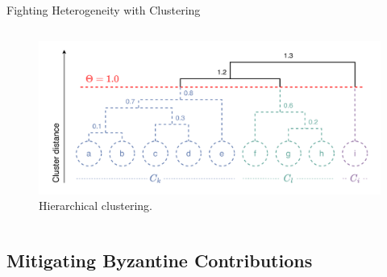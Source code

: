 \begin{frame}{Fighting Heterogeneity with Clustering}
\begin{columns}
{\begin{column}{.5\textwidth}
            \begin{figure}
                \centering
                \includegraphics[width=\textwidth]{figures/radar/clustering.drawio.pdf}
                \caption{Hierarchical clustering.}
            \end{figure}
        \end{column}
        }
    \end{columns}
\end{frame}



\subsection{Mitigating Byzantine Contributions}

